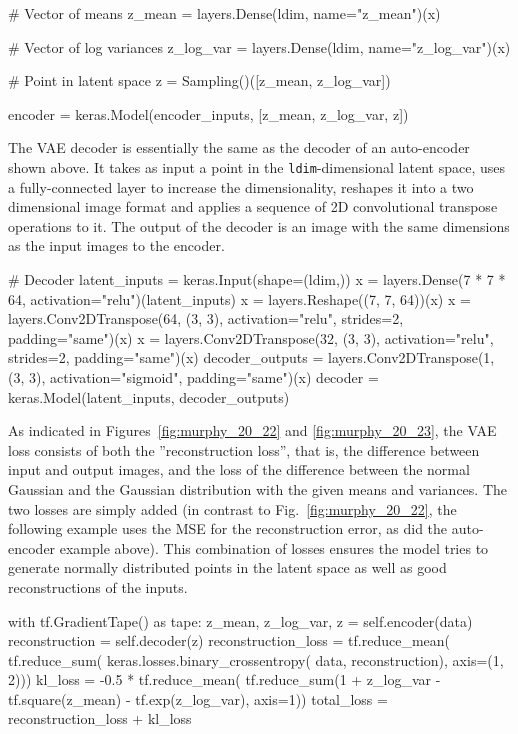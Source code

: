 \begin{withcode}
\begin{pythoncode}
# Vector of means
z_mean = layers.Dense(ldim, name="z_mean")(x)

# Vector of log variances
z_log_var = layers.Dense(ldim, name="z_log_var")(x)

# Point in latent space
z = Sampling()([z_mean, z_log_var])

encoder = keras.Model(encoder_inputs, [z_mean, z_log_var, z])
\end{pythoncode}

The VAE decoder is essentially the same as the decoder of an auto-encoder shown above. It takes as input a point in the \texttt{ldim}-dimensional latent space, uses a fully-connected layer to increase the dimensionality, reshapes it into a two dimensional image format and applies a sequence of 2D convolutional transpose operations to it. The output of the decoder is an image with the same dimensions as the input images to the encoder.

\begin{pythoncode}
# Decoder
latent_inputs = keras.Input(shape=(ldim,))
x = layers.Dense(7 * 7 * 64, activation="relu")(latent_inputs)
x = layers.Reshape((7, 7, 64))(x)
x = layers.Conv2DTranspose(64, (3, 3), activation="relu", 
             strides=2, padding="same")(x)
x = layers.Conv2DTranspose(32, (3, 3), activation="relu", 
             strides=2, padding="same")(x)
decoder_outputs = layers.Conv2DTranspose(1, (3, 3), 
             activation="sigmoid", padding="same")(x)
decoder = keras.Model(latent_inputs, decoder_outputs)
\end{pythoncode}

As indicated in Figures~\ref{fig:murphy_20_22} and \ref{fig:murphy_20_23}, the VAE loss consists of both the ''reconstruction loss'', that is, the difference between input and output images, and the loss of the difference between the normal Gaussian and the Gaussian distribution with the given means and variances. The two losses are simply added (in contrast to Fig.~\ref{fig:murphy_20_22}, the following example uses the MSE for the reconstruction error, as did the auto-encoder example above). This combination of losses ensures the model tries to generate normally distributed points in the latent space as well as good reconstructions of the inputs.

\begin{pythoncode}
with tf.GradientTape() as tape:
    z_mean, z_log_var, z = self.encoder(data)
    reconstruction = self.decoder(z)
    reconstruction_loss = tf.reduce_mean(
        tf.reduce_sum(
            keras.losses.binary_crossentropy(
                data, reconstruction), axis=(1, 2)))
	kl_loss = -0.5 * tf.reduce_mean(
	    tf.reduce_sum(1 + z_log_var - tf.square(z_mean) 
                      - tf.exp(z_log_var), axis=1))
    total_loss = reconstruction_loss + kl_loss
\end{pythoncode}


\end{withcode}
